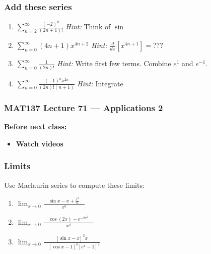 \documentclass[14pt]{beamer}
\newcommand{\setsize}[1]{\fontsize{#1}{#1}\selectfont} %
\newcommand{\smallerfont}{\setsize{13}} %
\begin{document}
	\begin{frame}[t]
		\smallerfont
		\frametitle{Add these series}

		\begin{enumerate}
			\item ${\displaystyle \sum_{n=2}^{\infty} \frac{(-2)^{n}}{(2n+1)!}}$ \hfill
				\emph{Hint:} Think of $\sin$

				\vfill

			\item ${\displaystyle \sum_{n=0}^{\infty} (4n+1) {x^{4n+2}}}$ \hfill \emph{Hint:}
				${\displaystyle \frac{d}{dx} \left[ x^{4n+1} \right] = ???}$

				\vfill

			\item ${\displaystyle \sum_{n=0}^{\infty} \frac{1}{(2n)!}}$ \hfill \emph{Hint:}
				Write first few terms. Combine ${\displaystyle e^1}$ and ${\displaystyle e^{-1}}$.

				\vfill

			\item ${\displaystyle \sum_{n=0}^{\infty} \frac{(-1)^{n} x^{2n}}{(2n)!(n+1)}}$
				\hfill \emph{Hint:} Integrate %

				\vfill
		\end{enumerate}
	\end{frame}








\begin{frame}
	\frametitle{MAT137 Lecture 71 ---  	Applications 2}

	\vfill
	{\bf Before next class:}
		\begin{itemize} \normalsize
			\item {\bf Watch videos }
		\end{itemize}
\end{frame}

	\begin{frame}[t]
		\frametitle{Limits}

		Use Maclaurin series to compute these limits:
		\vfill

		\begin{enumerate}
			\item \; ${\displaystyle \lim_{x \to 0} \frac{\quad \sin x - x + \frac{x^{3}}{6} \quad }{x^{5}}}$
				\vfill

			\item \; ${\displaystyle \lim_{x \to 0} \frac{\quad \cos(2x) - e^{-2x^2}\quad }{x^{4}}}$
				\vfill

			\item \; ${\displaystyle \lim_{x \to 0} \frac{\left[ \sin x - x \right]^{3} x }{\quad \left[ \cos x - 1\right]^{4} \left[ e^{x} - 1 \right]^{2} } \quad }$
				\vfill
		\end{enumerate}
	\end{frame}
\end{document}

